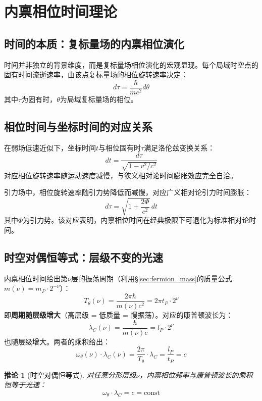 \documentclass[12pt,a4paper,twocolumn]{article}
\newtheorem{corollary}[theorem]{推论}
\begin{document}
\section{内禀相位时间理论}

\subsection{时间的本质：复标量场的内禀相位演化}
时间并非独立的背景维度，而是复标量场相位演化的宏观显现。每个局域时空点的固有时间流逝速率，由该点复标量场的相位旋转速率决定：
\[
d\tau = \frac{\hbar}{mc^2} d\theta
\]
其中$\tau$为固有时，$\theta$为局域复标量场的相位。

\subsection{相位时间与坐标时间的对应关系}
在弱场低速近似下，坐标时间$t$与相位固有时$\tau$满足洛伦兹变换关系：
\[
dt = \frac{d\tau}{\sqrt{1-v^2/c^2}}
\]
对应相位旋转速率随运动速度减慢，与狭义相对论时间膨胀效应完全自洽。

引力场中，相位旋转速率随引力势降低而减慢，对应广义相对论引力时间膨胀：
\[
d\tau = \sqrt{1+\frac{2\Phi}{c^2}}\,dt
\]
其中$\Phi$为引力势。该对应表明，内禀相位时间在经典极限下可退化为标准相对论时间。

\subsection{时空对偶恒等式：层级不变的光速}
\label{subsec:spacetime_duality}

内禀相位时间给出第$\nu$层的振荡周期（利用§\ref{sec:fermion_mass}的质量公式$m(\nu) = m_P \cdot 2^{-\nu}$）：
\begin{equation}
T_\theta(\nu) = \frac{2\pi\hbar}{m(\nu)c^2} = 2\pi t_P \cdot 2^{\nu}
\end{equation}
即\textbf{周期随层级增大}（高层级 = 低质量 = 慢振荡）。对应的康普顿波长为：
\begin{equation}
\lambda_C(\nu) = \frac{\hbar}{m(\nu)c} = l_P \cdot 2^{\nu}
\end{equation}
也随层级增大。两者的乘积给出：
\begin{equation}
\omega_\theta(\nu) \cdot \lambda_C(\nu) = \frac{2\pi}{T_\theta} \cdot \lambda_C = \frac{l_P}{t_P} = c
\end{equation}

\begin{corollary}[时空对偶恒等式]
\label{cor:spacetime_duality}
对任意分形层级$\nu$，内禀相位频率与康普顿波长的乘积恒等于光速：
\begin{equation}
\omega_\theta \cdot \lambda_C = c = \text{const}
\end{equation}
\end{corollary}
\end{document}

